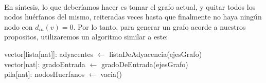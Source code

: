 \\
\par
En síntesis, lo que deberíamos hacer es tomar el grafo actual, y quitar todos los nodos huérfanos del mismo, reiteradas veces hasta que finalmente no haya ningún nodo con $d_{in} (v) = 0$. Por lo tanto, para generar un grafo acorde a nuestros propositos, utilizaremos un algoritmo similar a este:\\
\begin{algorithm}[H]
		\NoCaptionOfAlgo
		\caption{}
		
		vector[lista[nat]]: adyacentes $\leftarrow$ listaDeAdyacencia(ejesGrafo)\\
		vector[nat]: gradoEntrada $\leftarrow$ gradoDeEntrada(ejesGrafo)\\
		pila[nat]: nodosHuerfanos $\leftarrow$ vacia()\\

	\end{algorithm}


